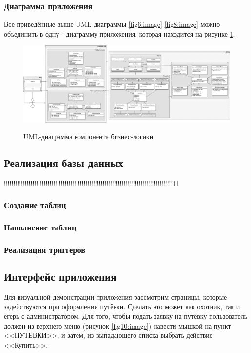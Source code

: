 		\subsubsection{Диаграмма приложения}
		Все приведённые выше UML-диаграммы \ref{fig6:image}-\ref{fig8:image} можно объединить в одну - диаграмму-приложения, которая находится на рисунке \ref{fig9:image}.
		
		\begin{figure}[ph!]
			\centering
			\begin{center}
				{\includegraphics[scale=0.28, angle=90]{schemes/uml_full.pdf}}
				\caption{UML-диаграмма компонента бизнес-логики}
				\label{fig9:image}
			\end{center}
		\end{figure}
	\newpage
	
	\subsection{Реализация базы данных}
	!!!!!!!!!!!!!!!!!!!!!!!!!!!!!!!!!!!!!!!!!!!!!!!!!!!!!!!!!!!!!!!!!!!!!!!!!!!!!!!!!!!!!!!!!11
	\subsubsection{Создание таблиц}
	\subsubsection{Наполнение таблиц}
	\subsubsection{Реализация триггеров}
	\subsubsection{}
	
	\subsection{Интерфейс приложения}
	Для визуальной демонстрации приложения рассмотрим страницы, которые задействуются при оформлении путёвки. Сделать это может как охотник, так и егерь с администратором. 
	Для того, чтобы подать заявку на путёвку пользователь должен из верхнего меню (рисунок \ref{fig10:image}) навести мышкой на пункт <<ПУТЁВКИ>>, и затем, из выпадающего списка выбрать действие <<Купить>>.
	

